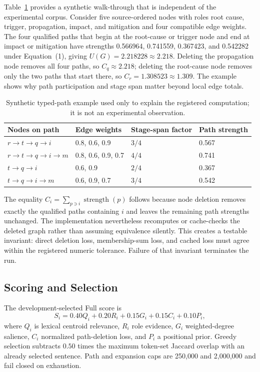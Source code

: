 \documentclass[applsci,article,submit,moreauthors]{Definitions/mdpi}
\begin{document}
Table~\ref{tab:toy-path} provides a synthetic walk-through that is independent of the experimental corpus. Consider five source-ordered nodes with roles root cause, trigger, propagation, impact, and mitigation and four compatible edge weights. The four qualified paths that begin at the root-cause or trigger node and end at impact or mitigation have strengths 0.566964, 0.741559, 0.367423, and 0.542282 under Equation~(1), giving $U(G)=2.218228\approx2.218$. Deleting the propagation node removes all four paths, so $C_{q}\approx2.218$; deleting the root-cause node removes only the two paths that start there, so $C_{r}=1.308523\approx1.309$. The example shows why path participation and stage span matter beyond local edge totals.

\begin{table}[H]
\caption{Synthetic typed-path example used only to explain the registered computation; it is not an experimental observation.}
\label{tab:toy-path}\centering\small
\begin{tabular}{llll}
\toprule
Nodes on path & Edge weights & Stage-span factor & Path strength\\
\midrule
$r\rightarrow t\rightarrow q\rightarrow i$ & 0.8, 0.6, 0.9 & $3/4$ & 0.567\\
$r\rightarrow t\rightarrow q\rightarrow i\rightarrow m$ & 0.8, 0.6, 0.9, 0.7 & $4/4$ & 0.741\\
$t\rightarrow q\rightarrow i$ & 0.6, 0.9 & $2/4$ & 0.367\\
$t\rightarrow q\rightarrow i\rightarrow m$ & 0.6, 0.9, 0.7 & $3/4$ & 0.542\\
\bottomrule
\end{tabular}
\end{table}

The equality $C_i=\sum_{p\ni i}\operatorname{strength}(p)$ follows because node deletion removes exactly the qualified paths containing $i$ and leaves the remaining path strengths unchanged. The implementation nevertheless recomputes or cache-checks the deleted graph rather than assuming equivalence silently. This creates a testable invariant: direct deletion loss, membership-sum loss, and cached loss must agree within the registered numeric tolerance. Failure of that invariant terminates the run.

\subsection{Scoring and Selection}

The development-selected Full score is
\begin{equation}
S_i=0.40Q_i+0.20R_i+0.15G_i+0.15C_i+0.10P_i,
\end{equation}
where $Q_i$ is lexical centroid relevance, $R_i$ role evidence, $G_i$ weighted-degree salience, $C_i$ normalized path-deletion loss, and $P_i$ a positional prior. Greedy selection subtracts $0.50$ times the maximum token-set Jaccard overlap with an already selected sentence. Path and expansion caps are 250,000 and 2,000,000 and fail closed on exhaustion.
\end{document}

